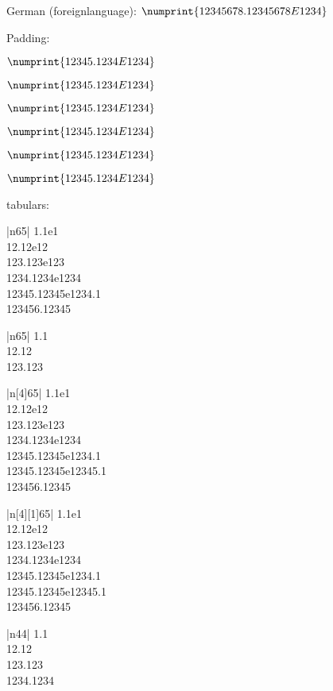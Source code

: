 \documentclass[portuges,french,ngerman,english,a4paper,fleqn,11pt]{article}
\begin{document}
German (foreignlanguage):
\foreignlanguage{ngerman}{$\numprint{12345678.12345678E1234}$}

\bigskip
Padding:\par
$\numprint{12345.1234E1234}$\par
\begingroup
{}
$\numprint{12345.1234E1234}$\par
\endgroup
$\numprint{12345.1234E1234}$\par
{}
$\numprint{12345.1234E1234}$\par
{}
$\numprint{12345.1234E1234}$\par
\npnolpadding
$\numprint{12345.1234E1234}$

\bigskip
tabulars:

\begin{tabular}{|n{6}{5}|}
  1.1e1 \\
  12.12e12 \\
  123.123e123 \\
  1234.1234e1234 \\
  12345.12345e1234.1 \\
  123456.12345
\end{tabular}

\begin{tabular}{|n{6}{5}|}
  1.1 \\
  12.12 \\
  123.123
\end{tabular}

\begin{tabular}{|n[4]{6}{5}|}
  1.1e1 \\
  12.12e12 \\
  123.123e123 \\
  1234.1234e1234 \\
  12345.12345e1234.1 \\
  12345.12345e12345.1 \\
  123456.12345
\end{tabular}

\begin{tabular}{|n[4][1]{6}{5}|}
  1.1e1 \\
  12.12e12 \\
  123.123e123 \\
  1234.1234e1234 \\
  12345.12345e1234.1 \\
  12345.12345e12345.1 \\
  123456.12345
\end{tabular}

\begin{tabular}{|n{4}{4}|}
  1.1 \\
  12.12 \\
  123.123 \\
  1234.1234
\end{tabular}
\end{document}

